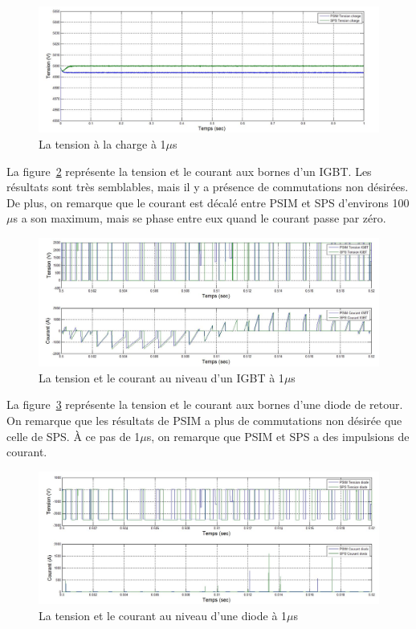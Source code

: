 \documentclass[11pt,letterpaper,final]{report}
\begin{document}
\begin{figure}[htb]
\centering
\includegraphics[scale=0.5]{Fig/AFE3LEVEL/1u/vch.jpg}
\caption{La tension à la charge à 1$\mu$s}
\label{AF_3_vch}
\end{figure}
La figure~\ref{AF_3_IGBT} représente la tension et le courant aux bornes d'un IGBT. Les résultats sont très semblables, mais il y a présence de commutations non désirées. De plus, on remarque que le courant est décalé entre PSIM et SPS d'environs 100$\mu$s a son maximum, mais se phase entre eux quand le courant passe par zéro.

\begin{figure}[htb]
\centering
\includegraphics[scale=0.5]{Fig/AFE3LEVEL/1u/IGBT.jpg}
\caption{La tension et le courant au niveau d'un IGBT à 1$\mu$s}
\label{AF_3_IGBT}
\end{figure}
La figure~\ref{AF_3_DIODE} représente la tension et le courant aux bornes d'une diode de retour. On remarque que les résultats de PSIM a plus de commutations non désirée que celle de SPS. À ce pas de 1$\mu$s, on remarque que PSIM et SPS a des impulsions de courant.

\begin{figure}[htb]
\centering
\includegraphics[scale=0.5]{Fig/AFE3LEVEL/1u/DIODE.jpg}
\caption{La tension et le courant au niveau d'une diode à 1$\mu$s}
\label{AF_3_DIODE}
\end{figure}
\end{document}
